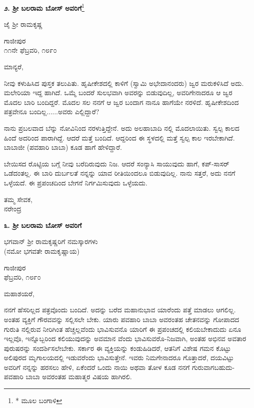 \begin{center}
\textbf{೨. ಶ‍್ರೀ ಬಲರಾಮ ಬೋಸ್ ಅವರಿಗೆ}\footnote{* ಮೂಲ ಬಂಗಾಳಿ}
\end{center}

\begin{center}
ಜೈ ಶ‍್ರೀ ರಾಮಕೃಷ್ಣ
\end{center}

\begin{flushright}
ಗಾಜೀಪುರ\\೧೧ನೇ ಫೆಬ್ರವರಿ, ೧೮೯೦
\end{flushright}

ಮಾನ್ಯರೆ,

ನೀವು ಕಳುಹಿಸಿದ ಪುಸ್ತಕ ತಲುಪಿತು. ಹೃಷೀಕೇಶದಲ್ಲಿ ಕಾಳಿಗೆ (ಸ್ವಾಮಿ ಅಭೇದಾನಂದರು) ಜ್ವರ ಮರುಕಳಿಸಿದೆ ಅದು. ಮಲೇರಿಯಾ ಇದ್ದ ಹಾಗಿದೆ. ಒಮ್ಮೆ ಬಂದರೆ ಸುಲಭವಾಗಿ ಅವರನ್ನು ಬಿಡುವುದಿಲ್ಲ, ಅವರಿಗೇನಾದರೂ ಆ ಜ್ವರ ಮೊದಲ ಬಾರಿ ಬಂದಿದ್ದರೆ. ಮೊದಲ ಸಲ ನನಗೆ ಆ ಜ್ವರ ಬಂದಾಗ ನಾನೂ ಹಾಗೆಯೇ ನರಳಿದೆ. ಹೃಷೀಕೇಶದಿಂದ ಪತ್ರವೇನೂ ಬಂದಿಲ್ಲ......ಅವರು ಎಲ್ಲಿದ್ದಾರೆ?

ನಾನು ಪ್ರಬಲವಾದ ಬೆನ್ನು ನೋವಿನಿಂದ ನರಳುತ್ತಿದ್ದೇನೆ. ಅದು ಅಲಹಾಬಾದಿ ನಲ್ಲಿ ಮೊದಲಾಯಿತು. ಸ್ವಲ್ಪ ಕಾಲದ ಹಿಂದೆ ಅದರಿಂದ ಪಾರಾಗಿದ್ದೆ. ಆದರೆ ಮತ್ತೆ ಬಂದಿದೆ. ಆದ್ದರಿಂದ ಈ ಸ್ಥಳದಲ್ಲಿ ಮತ್ತೆ ಸ್ವಲ್ಪ ಕಾಲ ಇರಬೇಕಾಗಿದೆ. ಬಾಬಾಜೀ (ಪವಹಾರಿ ಬಾಬಾ) ಕೂಡ ಹಾಗೆ ಹೇಳಿದ್ದಾರೆ.

ಬೇಯಿಸದ ರೊಟ್ಟಿಯ ಬಗ್ಗೆ ನೀವು ಬರೆದಿರುವುದು ನಿಜ. ಆದರೆ ಸಂನ್ಯಾಸಿ ಸಾಯುವುದು ಹಾಗೆ, ಕಪ್-ಸಾಸರ್ ಒಡೆದಂತಲ್ಲ. ಈ ಬಾರಿ ದುರ್ಬಲತೆ ನನ್ನನ್ನು ಯಾವ ರೀತಿಯಿಂದಲೂ ಬಿಡುವುದಿಲ್ಲ. ನಾನು ಸತ್ತರೆ, ಅದು ನನಗೆ ಒಳ್ಳೆಯದೆ. ಈ ಪ್ರಪಂಚದಿಂದ ಬೇಗನೆ ನಿರ್ಗಮಿಸುವುದು ಒಳ್ಳೆಯದು.

\begin{flushright}
ತಮ್ಮ ಸೇವಕ,\\ನರೇಂದ್ರ
\end{flushright}

\begin{center}
\textbf{೩. ಶ‍್ರೀ ಬಲರಾಮ ಬೋಸ್ ಅವರಿಗೆ}
\end{center}

\begin{center}
ಭಗವಾನ್ ಶ‍್ರೀ ರಾಮಕೃಷ್ಣರಿಗೆ ನಮಸ್ಕಾರಗಳು\\(ನಮೋ ಭಗವತೇ ರಾಮಕೃಷ್ಣಾಯ)
\end{center}

\begin{flushright}
ಗಾಜೀಪುರ\\ಫೆಬ್ರವರಿ, ೧೮೯೦
\end{flushright}

ಮಹಾಶಯರೆ,

ನನಗೆ ಹೆಸರಿಲ್ಲದ ಪತ್ರವೊಂದು ಬಂದಿದೆ. ಅದನ್ನು ಬರೆದ ಮಹಾನುಭಾವ ಯಾರೆಂದು ಪತ್ತೆ ಮಾಡಲು ಆಗಲಿಲ್ಲ. ಅಂತಹ ವ್ಯಕ್ತಿಗೆ ಗೌರವವನ್ನು ಸಲ್ಲಿಸಲೇ ಬೇಕು. ಯಾರು ಪವಹಾರಿ ಬಾಬಾ ಅವರಂತಹ ಚೇತನವನ್ನು ಗೋಪಾದದ ಗುರುತಿ ನಲ್ಲಿರುವ ನೀರಿಗಿಂತ ಹೆಚ್ಚಲ್ಲವೆಂದು ಭಾವಿಸುವನೊ ಯಾರಿಗೆ ಈ ಪ್ರಪಂಚದಲ್ಲಿ ಕಲಿಯಬೇಕಾದುದು ಏನೂ ಇಲ್ಲವೊ, ಇನ್ನೊಬ್ಬರಿಂದ ಕಲಿಯುವುದನ್ನು ಅವಮಾನ ವೆಂದು ಭಾವಿಸುವರೊ-ನಿಜವಾಗಿ, ಅಂತಹ ಅಭಿನವ ಅವತಾರ ಪುರುಷರನ್ನು ಸಂದರ್ಶಿಸಲೇಬೇಕು. ಸರ್ಕಾರ ಈ ವ್ಯಕ್ತಿಯನ್ನು ಕಂಡುಹಿಡಿದರೆ, ಆತನಿಗೆ ವಿಶೇಷ ಗಮನ ಕೊಟ್ಟು ಅಲಿಪುರದ ಮೃಗಾಲಯದಲ್ಲಿ ಇಡುವರೆಂದು ಭಾವಿಸುತ್ತೇನೆ. ಇವರು ನಿಮಗೇನಾದರೂ ಗೊತ್ತಾದರೆ, ದಯವಿಟ್ಟು ಅವರಿಗೆ ನನ್ನನ್ನು ಹರಸಲು ಹೇಳಿ, ಏಕೆಂದರೆ ಒಂದು ನಾಯಿ ಅಥವಾ ತೋಳ ಕೂಡ ನನಗೆ ಗುರುವಾಗಬಹುದು- ಪವಹಾರಿ ಬಾಬಾ ಅವರಂತಹ ಮಹಾತ್ಮರ ವಿಷಯ ಹಾಗಿರಲಿ.

